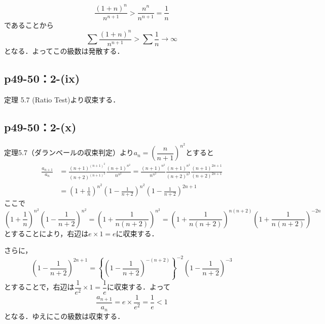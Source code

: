 \documentclass[a4paper,10pt,fleqn]{ltjsarticle}
\begin{document}
        \begin{screen}
        \[
        \frac{(1+n)^n}{n^{n+1}}>\frac{n^n}{n^{n+1}}=\frac{1}{n}
        \]
        であることから
        \[
        \sum \frac{(1+n)^n}{n^{n+1}}>\sum \frac{1}{n} \rightarrow \infty
        \]
        となる．よってこの級数は発散する．
        \end{screen}
        

        \subsection*{p49-50：2-(ix)}

        \begin{screen}
            定理 5.7 (Ratio Test)より収束する．
        \end{screen}

        \subsection*{p49-50：2-(x)}

        \begin{screen}
        定理5.7（ダランベールの収束判定）より$a_n=\left(\dfrac{n}{n+1}\right)^{n^2}$とすると
        \begin{align*}
        \frac{a_{n+1}}{a_n}&=\frac{(n+1)^{(n+1)^2}}{(n+2)^{(n+1)^2}}\frac{(n+1)^{n^2}}{n^{n^2}}=\frac{(n+1)^{n^2}}{n^{n^2}}\frac{(n+1)^{n^2}}{(n+2)^{n^2}}\frac{(n+1)^{2n+1}}{(n+2)^{2n+1}}\\
        &=\left(1+\frac{1}{n}\right)^{n^2}\left(1-\frac{1}{n+2}\right)^{n^2}\left(1-\frac{1}{n+2}\right)^{2n+1}
        \end{align*}
        ここで
        \[
        \left(1+\frac{1}{n}\right)^{n^2}\left(1-\frac{1}{n+2}\right)^{n^2}=\left(1+\frac{1}{n(n+2)}\right)^{n^2}=\left(1+\frac{1}{n(n+2)}\right)^{n(n+2)}\left(1+\frac{1}{n(n+2)}\right)^{-2n}
        \]
        とすることにより，右辺は$e \times 1=e$に収束する．
        
        さらに，
        \[
        \left(1-\frac{1}{n+2}\right)^{2n+1}=\left\{\left(1-\frac{1}{n+2}\right)^{-(n+2)}\right\}^{-2}\left(1-\frac{1}{n+2}\right)^{-3}
        \]
        とすることで，右辺は$\dfrac{1}{e^2} \times 1=\dfrac{1}{e}$に収束する．よって
        \[
        \frac{a_{n+1}}{a_n}=e \times \frac{1}{e^2}=\frac{1}{e}<1
        \]
        となる．ゆえにこの級数は収束する．
    \end{screen}
\end{document}
